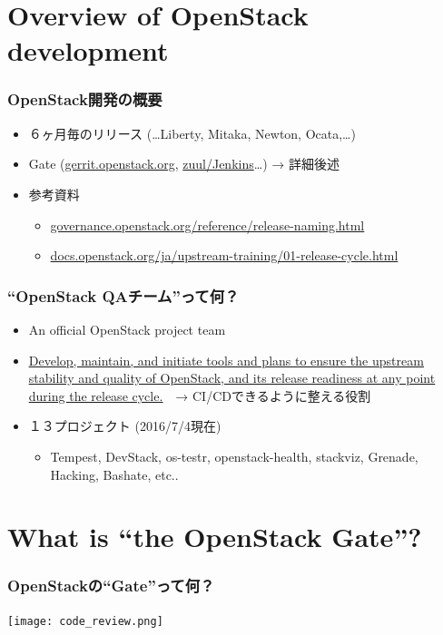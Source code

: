 \documentclass[aspectratio=169,11pt,hyperref={colorlinks=true}]{beamer}
\begin{document}
\section{Overview of OpenStack development}
\begin{frame}
  \frametitle{OpenStack開発の概要}
  \begin{itemize}
    \item ６ヶ月毎のリリース (\ldots Liberty, Mitaka, Newton, Ocata,\ldots)
    \item Gate (\href{https://gerrit.openstack.org}{gerrit.openstack.org},
      \href{http://zuul.openstack.org/}{zuul/Jenkins}\ldots) → 詳細後述
    \item 参考資料
      \begin{itemize}
        \item \href{http://governance.openstack.org/reference/release-naming.html}{governance.openstack.org/reference/release-naming.html}
        \item \href{http://docs.openstack.org/ja/upstream-training/01-release-cycle.html}{docs.openstack.org/ja/upstream-training/01-release-cycle.html}
      \end{itemize}
  \end{itemize}
\end{frame}

\begin{frame}
  \frametitle{``OpenStack QAチーム''って何？}
  \begin{itemize}
    \item An official OpenStack project team
    \item \href{https://wiki.openstack.org/wiki/QA}{\ul{Develop, maintain,
      and initiate tools and plans to ensure the upstream stability
      and quality of OpenStack, and its release readiness at any point
      during the release cycle.}}　→ CI/CDできるように整える役割
    \item １３プロジェクト (2016/7/4現在)
    \begin{itemize}
      \item Tempest, DevStack, os-testr, openstack-health, stackviz, Grenade, Hacking, Bashate, etc..
    \end{itemize}
  \end{itemize}
\end{frame}

\section{What is ``the OpenStack Gate''?}
\begin{frame}
  \frametitle{OpenStackの``Gate''って何？}
  \begin{center}
    \texttt{[image: code\_review.png]}
  \end{center}
\end{frame}
\end{document}
